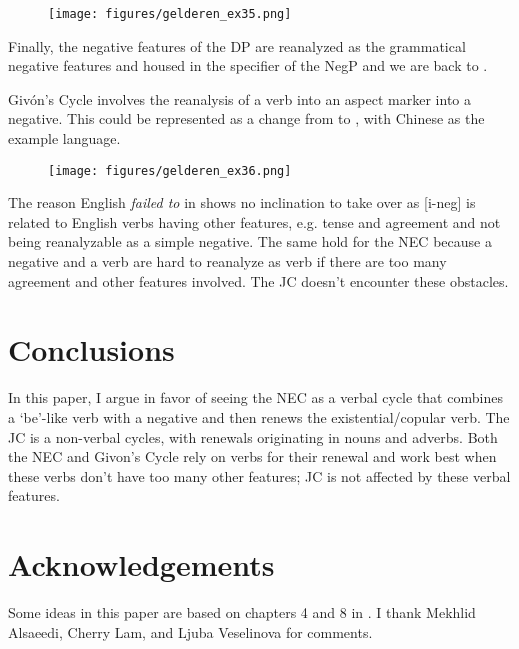 ﻿\documentclass[output=paper]{langsci/langscibook}
\begin{document}
\begin{figure}
    \label{ex:other-more-phases}
    \texttt{[image: figures/gelderen\_ex35.png]}
\end{figure}


Finally, the negative features of the DP are reanalyzed as the grammatical
negative features and housed in the specifier of the NegP and we are back
to .

Givón's Cycle involves the reanalysis of a verb into an aspect marker into
a negative. This could be represented as a change from
 to
, with Chinese as the example language.

\begin{figure}
    \label{ex:other-even-more-phases}
    \texttt{[image: figures/gelderen\_ex36.png]}
\end{figure}


The reason English \textit{failed to} in 
shows no inclination to take over as [i-neg] is related to English verbs
having other features, e.g. tense and agreement and not being reanalyzable
as a simple negative. The same hold for the NEC because a negative and a
verb are hard to reanalyze as verb if there are too many agreement and
other features involved. The JC doesn't encounter these obstacles.

\section{Conclusions}\label{sec:oth-6}

In this paper, I argue in favor of seeing the NEC as a verbal cycle that
combines a `be'-like verb with a negative and then renews the
existential\slash copular verb. The JC is a non-verbal cycles, with
renewals originating in nouns and adverbs. Both the NEC and Givon's Cycle
rely on verbs for their renewal and work best when these verbs don't have
too many other features; JC is not affected by these verbal features. 

\section*{Acknowledgements}\label{sec:oth-acknowledgements}

Some ideas in this paper are based on chapters 4 and 8 in
\textcite{Gelderen2011}. I thank Mekhlid Alsaeedi, Cherry Lam, and Ljuba
Veselinova for comments.
\end{document}

